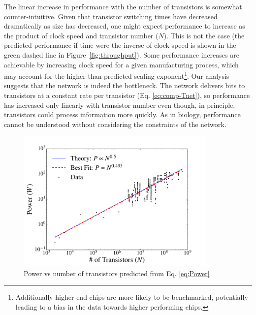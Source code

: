\documentclass[12pt]{article}
\begin{document}
The linear increase in performance with the number of transistors is somewhat
counter-intuitive. Given that transistor switching times have decreased
dramatically as size has decreased, one might expect performance to increase as
the product of clock speed and transistor number ($N$). This is not the case (the
predicted performance if time were the inverse of clock speed is shown in the
green dashed line in Figure~\ref{fig:throughput}). Some performance increases
are achievable by increasing clock speed for a given manufacturing process,
which may account for the higher than predicted scaling
exponent\footnote{Additionally higher end chips are more likely to be
  benchmarked, potentially leading to a bias in the data towards higher
performing chips.}. Our analysis suggests that the network is indeed
the bottleneck. The network delivers bits to transistors at a constant rate per transistor
(Eq. \ref{eq:comp-Tnet}), so performance has increased only linearly with transistor
number even though, in principle, transistors could process information more
quickly.  As in biology, performance cannot be
understood without considering the constraints of the network.


\begin{figure}[!h]
\centering
\includegraphics[height=70mm]{Figures/ChipsPowerScaling.pdf}
\caption{Power vs number of transistors predicted from Eq. \ref{eq:Power}}
\label{fig:power}
\end{figure}
\end{document}
